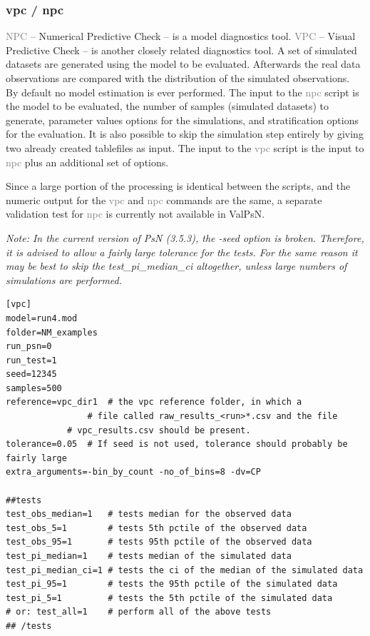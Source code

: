 \documentclass[a4,11pt]{report} \usepackage[pdftex]{graphicx}
\newcommand{\psn}[1]{\textcolor{Grey}{#1}}
\begin{document}
\subsubsection{vpc / npc}
\psn{NPC} – Numerical Predictive Check – is a model diagnostics
tool. \psn{VPC} – Visual Predictive Check – is another closely related
diagnostics tool. A set of simulated datasets are generated using the
model to be evaluated. Afterwards the real data observations are
compared with the distribution of the simulated observations. By
default no model estimation is ever performed. The input to the
\psn{npc} script is the model to be evaluated, the number of samples
(simulated datasets) to generate, parameter values options for the
simulations, and stratification options for the evaluation. It is also
possible to skip the simulation step entirely by giving two already
created tablefiles as input. The input to the \psn{vpc} script is the
input to \psn{npc} plus an additional set of options.

\vspace{10pt}

\noindent Since a large portion of the processing is
identical between the scripts, and the numeric output for the
\psn{vpc} and \psn{npc} commands are the same, a separate validation
test for \psn{npc} is currently not available in ValPsN.

\vspace{10pt}

\noindent \textit{Note: In the current version of PsN (3.5.3), the
  -seed option is broken. Therefore, it is advised to allow a fairly
  large tolerance for the tests. For the same reason it may be best to
  skip the test\_pi\_median\_ci altogether, unless large numbers of
  simulations are performed.}

\begin{lstlisting}
[vpc]
model=run4.mod
folder=NM_examples
run_psn=0
run_test=1
seed=12345
samples=500
reference=vpc_dir1  # the vpc reference folder, in which a
	            # file called raw_results_<run>*.csv and the file
		    # vpc_results.csv should be present.
tolerance=0.05  # If seed is not used, tolerance should probably be fairly large
extra_arguments=-bin_by_count -no_of_bins=8 -dv=CP

##tests
test_obs_median=1   # tests median for the observed data
test_obs_5=1        # tests 5th pctile of the observed data
test_obs_95=1       # tests 95th pctile of the observed data
test_pi_median=1    # tests median of the simulated data
test_pi_median_ci=1 # tests the ci of the median of the simulated data
test_pi_95=1        # tests the 95th pctile of the simulated data
test_pi_5=1         # tests the 5th pctile of the simulated data
# or: test_all=1    # perform all of the above tests
## /tests
\end{lstlisting}
\end{document}
